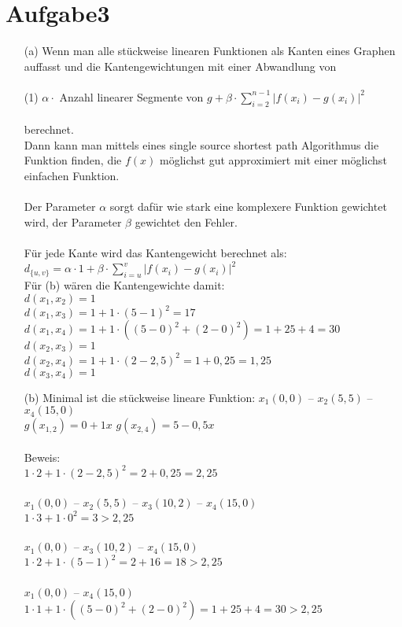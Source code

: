 \documentclass{article}
\begin{document}
\section*{Aufgabe3}
\begin{enumerate}
\item[(a)] Wenn man alle stückweise linearen Funktionen als Kanten eines Graphen auffasst und die Kantengewichtungen mit einer Abwandlung von \\\\
(1) $ \alpha \cdot$ Anzahl linearer Segmente von $g + \beta \cdot \sum_{i=2}^{n-1} \lvert f(x_i)-g(x_i) \lvert ^2$ \\\\
berechnet. \\
Dann kann man mittels eines single source shortest path Algorithmus die Funktion finden, die $f(x)$ möglichst gut approximiert mit einer möglichst einfachen Funktion. \\\\
Der Parameter $\alpha$ sorgt dafür wie stark eine komplexere Funktion gewichtet wird, der Parameter $\beta$ gewichtet den Fehler.\\\\
Für jede Kante wird das Kantengewicht berechnet als:\\
 $d_{\{u,v\}} = \alpha \cdot 1 + \beta \cdot \sum_{i=u}^{v} \lvert f(x_i)-g(x_i) \lvert ^2$\\
 Für (b) wären die Kantengewichte damit:\\
 $d(x_1,x_2) = 1$ \\
 $d(x_1,x_3) = 1 + 1 \cdot (5-1)^2 = 17$ \\
 $d(x_1,x_4) = 1 + 1 \cdot ((5-0)^2+(2-0)^2) = 1 + 25 + 4 = 30$ \\
 $d(x_2,x_3) = 1$ \\
 $d(x_2,x_4) = 1+1 \cdot (2-2,5)^2 = 1+0,25=1,25$ \\
 $d(x_3,x_4) = 1$
\item[(b)] Minimal ist die stückweise lineare Funktion: $x_1 (0,0)$ -- $x_2 (5,5)$ -- $x_4 (15,0)$ \\
$g(x_{1,2}) = 0 + 1x$ $g(x_ {2,4}) = 5 - 0,5x$ \\\\
Beweis: \\
$1 \cdot 2 + 1 \cdot (2-2,5)^2 = 2+ 0,25 = 2,25$\\\\
$x_1 (0,0)$ -- $x_2 (5,5)$ -- $x_3 (10,2)$ -- $x_4 (15,0)$ \\
$1 \cdot 3 + 1 \cdot 0^2=3>2,25$\\\\
$x_1 (0,0)$ -- $x_3 (10,2)$ -- $x_4 (15,0)$ \\
$1 \cdot 2 + 1 \cdot (5-1)^2 = 2 + 16 = 18> 2,25$\\\\
$x_1 (0,0)$ -- $x_4 (15,0)$ \\
$1 \cdot 1 + 1 \cdot ((5-0)^2+(2-0)^2) = 1 + 25 + 4 = 30 >2,25$\\
\end{enumerate}
\end{document}
